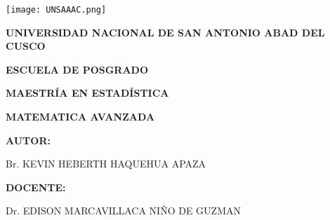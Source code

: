 \thispagestyle{empty}


\begin{center}
\texttt{[image: UNSAAAC.png]} 
\end{center}
\begin{center}

\begin{center}

\fontsize{14pt}{11pt}
\selectfont\bfseries { \textcolor{carmine}{UNIVERSIDAD NACIONAL DE SAN ANTONIO ABAD DEL CUSCO}} \\

\vspace{0.3cm}
\fontsize{14pt}{11pt}

\selectfont\bfseries { \textcolor{carmine}{ESCUELA DE POSGRADO} } \\
\fontsize{14pt}{11pt}

\vspace{0.3cm}
\selectfont\bfseries {MAESTRÍA EN ESTADÍSTICA} 
\end{center}

\vspace{3cm}


\fboxsep 16pt
\end{center}

\begin{center}
\fontsize{14pt}{11pt}\selectfont\bfseries{MATEMATICA AVANZADA} 
\end{center}


\hspace{6.5cm} \textbf{AUTOR:} \nolinebreak
\vspace{-0.3cm}

\hspace{6.5cm} Br. KEVIN HEBERTH HAQUEHUA APAZA


\hspace{6.5cm} \textbf{DOCENTE:} \nolinebreak
\vspace{-0.3cm}

\hspace{6.5cm} Dr. EDISON MARCAVILLACA NIÑO DE GUZMAN
\vspace{-0.3cm}

